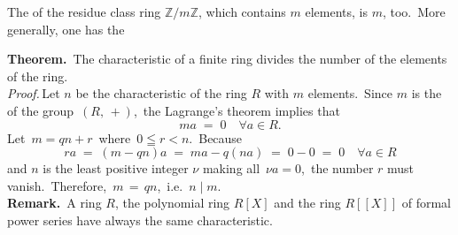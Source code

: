 \documentclass[12pt]{article}
\theoremstyle{definition}
\begin{document}

The  of the residue class ring $\mathbb{Z}/m\mathbb{Z}$, which contains $m$ elements, is $m$, too.\, More generally, one has the


\textbf{Theorem.}\, The characteristic of a finite ring divides the number of the elements of the ring.\\

\emph{Proof.}\,Let $n$ be the characteristic of the ring $R$ with $m$ elements.\, Since $m$ is the  of the group 
\,$(R,\,+)$,\, the Lagrange's theorem implies that
$$ma \;=\; 0 \quad \forall a \in R.$$
Let\, $m = qn\!+\!r$\, where\, $0 \leqq r < n$.\, Because
$$ra \;=\; (m\!-\!qn)a \;=\; ma\!-\!q(na) \;=\; 0\!-\!0 \;=\; 0 \quad \forall a \in R$$
and $n$ is the least positive integer $\nu$ making all\, $\nu a = 0$,\, the number $r$ must vanish.\, Therefore,\, 
$m \,=\, qn$,\, i.e.\, $n \mid m$.\\


\textbf{Remark.}\, A ring $R$, the polynomial ring $R[X]$ and the ring $R[[X]]$ of formal power series have always the same characteristic.

\end{document}
